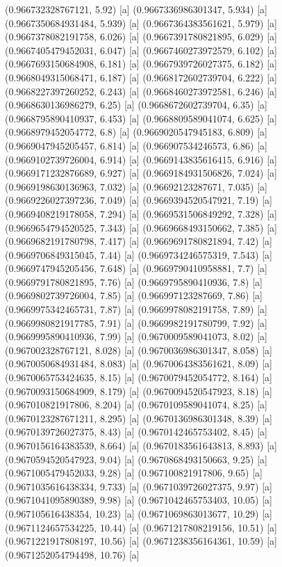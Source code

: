 {{{(0.966732328767121, 5.92) [a] 
(0.9667336986301347, 5.934) [a] 
(0.9667350684931484, 5.939) [a] 
(0.9667364383561621, 5.979) [a] 
(0.9667378082191758, 6.026) [a] 
(0.9667391780821895, 6.029) [a] 
(0.9667405479452031, 6.047) [a] 
(0.9667460273972579, 6.102) [a] 
(0.9667693150684908, 6.181) [a] 
(0.9667939726027375, 6.182) [a] 
(0.9668049315068471, 6.187) [a] 
(0.9668172602739704, 6.222) [a] 
(0.9668227397260252, 6.243) [a] 
(0.9668460273972581, 6.246) [a] 
(0.9668630136986279, 6.25) [a] 
(0.9668672602739704, 6.35) [a] 
(0.9668795890410937, 6.453) [a] 
(0.9668809589041074, 6.625) [a] 
(0.9668979452054772, 6.8) [a] 
(0.9669020547945183, 6.809) [a] 
(0.9669047945205457, 6.814) [a] 
(0.966907534246573, 6.86) [a] 
(0.9669102739726004, 6.914) [a] 
(0.9669143835616415, 6.916) [a] 
(0.9669171232876689, 6.927) [a] 
(0.9669184931506826, 7.024) [a] 
(0.9669198630136963, 7.032) [a] 
(0.96692123287671, 7.035) [a] 
(0.9669226027397236, 7.049) [a] 
(0.9669394520547921, 7.19) [a] 
(0.9669408219178058, 7.294) [a] 
(0.9669531506849292, 7.328) [a] 
(0.9669654794520525, 7.343) [a] 
(0.9669668493150662, 7.385) [a] 
(0.9669682191780798, 7.417) [a] 
(0.9669691780821894, 7.42) [a] 
(0.9669706849315045, 7.44) [a] 
(0.9669734246575319, 7.543) [a] 
(0.9669747945205456, 7.648) [a] 
(0.9669790410958881, 7.7) [a] 
(0.9669791780821895, 7.76) [a] 
(0.9669795890410936, 7.8) [a] 
(0.9669802739726004, 7.85) [a] 
(0.966997123287669, 7.86) [a] 
(0.9669975342465731, 7.87) [a] 
(0.9669978082191758, 7.89) [a] 
(0.9669980821917785, 7.91) [a] 
(0.9669982191780799, 7.92) [a] 
(0.9669995890410936, 7.99) [a] 
(0.9670009589041073, 8.02) [a] 
(0.967002328767121, 8.028) [a] 
(0.9670036986301347, 8.058) [a] 
(0.9670050684931484, 8.083) [a] 
(0.9670064383561621, 8.09) [a] 
(0.9670065753424635, 8.15) [a] 
(0.9670079452054772, 8.164) [a] 
(0.9670093150684909, 8.179) [a] 
(0.9670094520547923, 8.18) [a] 
(0.967010821917806, 8.204) [a] 
(0.9670109589041074, 8.25) [a] 
(0.9670123287671211, 8.295) [a] 
(0.9670136986301348, 8.39) [a] 
(0.9670139726027375, 8.43) [a] 
(0.9670142465753402, 8.45) [a] 
(0.9670156164383539, 8.664) [a] 
(0.9670183561643813, 8.893) [a] 
(0.9670594520547923, 9.04) [a] 
(0.9670868493150663, 9.25) [a] 
(0.9671005479452033, 9.28) [a] 
(0.967100821917806, 9.65) [a] 
(0.9671035616438334, 9.733) [a] 
(0.9671039726027375, 9.97) [a] 
(0.9671041095890389, 9.98) [a] 
(0.9671042465753403, 10.05) [a] 
(0.967105616438354, 10.23) [a] 
(0.9671069863013677, 10.29) [a] 
(0.9671124657534225, 10.44) [a] 
(0.9671217808219156, 10.51) [a] 
(0.9671221917808197, 10.56) [a] 
(0.9671238356164361, 10.59) [a] 
(0.9671252054794498, 10.76) [a] 
}}}
